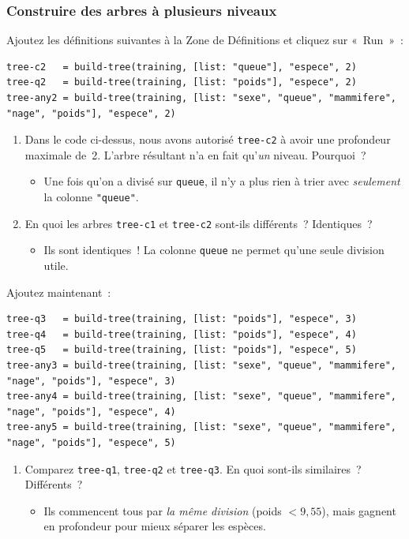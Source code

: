 \documentclass[12pt,a4paper]{article}
\begin{document}
\subsubsection{Construire des arbres à plusieurs niveaux}

\begin{activitybox}
  Ajoutez les définitions suivantes à la Zone de Définitions et cliquez sur «~Run~»~:
  \begin{lstlisting}
tree-c2   = build-tree(training, [list: "queue"], "espece", 2)
tree-q2   = build-tree(training, [list: "poids"], "espece", 2)
tree-any2 = build-tree(training, [list: "sexe", "queue", "mammifere", "nage", "poids"], "espece", 2)
  \end{lstlisting}

  \begin{enumerate}[leftmargin=*]
    \item Dans le code ci-dessus, nous avons autorisé \texttt{tree-c2} à avoir une profondeur maximale de~2. L'arbre résultant n'a en fait qu'\emph{un} niveau. Pourquoi~?
    \begin{itemize}
      \item Une fois qu'on a divisé sur \texttt{queue}, il n'y a plus rien à trier avec \emph{seulement} la colonne \texttt{"queue"}.
    \end{itemize}
    \item En quoi les arbres \texttt{tree-c1} et \texttt{tree-c2} sont-ils différents~? Identiques~?
    \begin{itemize}
      \item Ils sont identiques~! La colonne \texttt{queue} ne permet qu'une seule division utile.
    \end{itemize}
  \end{enumerate}

  Ajoutez maintenant~:
  \begin{lstlisting}
tree-q3   = build-tree(training, [list: "poids"], "espece", 3)
tree-q4   = build-tree(training, [list: "poids"], "espece", 4)
tree-q5   = build-tree(training, [list: "poids"], "espece", 5)
tree-any3 = build-tree(training, [list: "sexe", "queue", "mammifere", "nage", "poids"], "espece", 3)
tree-any4 = build-tree(training, [list: "sexe", "queue", "mammifere", "nage", "poids"], "espece", 4)
tree-any5 = build-tree(training, [list: "sexe", "queue", "mammifere", "nage", "poids"], "espece", 5)
  \end{lstlisting}

  \begin{enumerate}[leftmargin=*, resume]
    \item Comparez \texttt{tree-q1}, \texttt{tree-q2} et \texttt{tree-q3}. En quoi sont-ils similaires~? Différents~?
    \begin{itemize}
      \item Ils commencent tous par \emph{la même division} (poids $< 9{,}55$), mais gagnent en profondeur pour mieux séparer les espèces.
    \end{itemize}
  \end{enumerate}
\end{activitybox}
\end{document}
